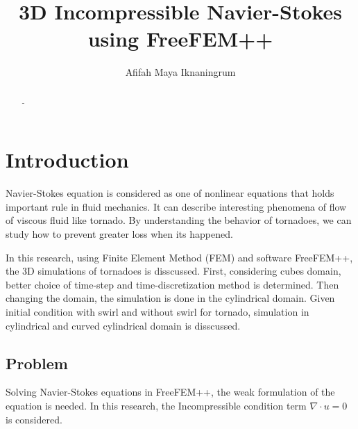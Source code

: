 \documentclass[a4paper]{article}
\title{3D Incompressible Navier-Stokes using FreeFEM++}
\author{Afifah Maya Iknaningrum}
\begin{document}

\maketitle

\begin{abstract}
-
\end{abstract}

\section{Introduction}

Navier-Stokes equation is considered as one of nonlinear equations that holds important rule in fluid mechanics. It can describe interesting phenomena of flow of viscous fluid like tornado. By understanding the behavior of tornadoes, we can study how to prevent greater loss when its happened.

In this research, using Finite Element Method (FEM) and software FreeFEM++, the 3D simulations of tornadoes is disscussed. First, considering cubes domain, better choice of time-step and time-discretization method is determined. Then changing the domain, the simulation is done in the cylindrical domain. Given initial condition with swirl and without swirl for tornado, simulation in cylindrical and curved cylindrical domain is disscussed.

\subsection{Problem}
Solving Navier-Stokes equations in FreeFEM++, the weak formulation of the equation is needed. In this research, the Incompressible condition term $ \nabla \cdot u = 0 $ is considered.
\end{document}
